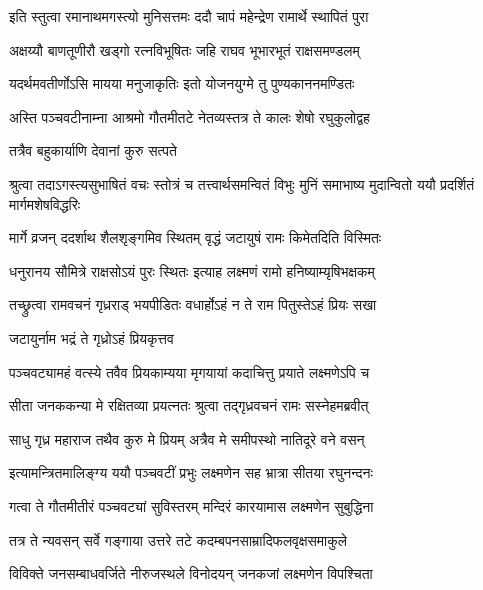 \twolineshloka
{इति स्तुत्वा रमानाथमगस्त्यो मुनिसत्तमः}
{ददौ चापं महेन्द्रेण रामार्थे स्थापितं पुरा} %

\twolineshloka
{अक्षय्यौ बाणतूणीरौ खड्गो रत्नविभूषितः}
{जहि राघव भूभारभूतं राक्षसमण्डलम्} %

\twolineshloka
{यदर्थमवतीर्णोऽसि मायया मनुजाकृतिः}
{इतो योजनयुग्मे तु पुण्यकाननमण्डितः} %

\twolineshloka
{अस्ति पञ्चवटीनाम्ना आश्रमो गौतमीतटे}
{नेतव्यस्तत्र ते कालः शेषो रघुकुलोद्वह} %

\onelineshloka
{तत्रैव बहुकार्याणि देवानां कुरु सत्पते} %


\fourlineindentedshloka
{श्रुत्वा तदाऽगस्त्यसुभाषितं वचः}
{स्तोत्रं च तत्त्वार्थसमन्वितं विभुः}
{मुनिं समाभाष्य मुदान्वितो ययौ}
{प्रदर्शितं मार्गमशेषविद्धरिः} %






\twolineshloka
{मार्गे व्रजन् ददर्शाथ शैलशृङ्गमिव स्थितम्}
{वृद्धं जटायुषं रामः किमेतदिति विस्मितः} %

\twolineshloka
{धनुरानय सौमित्रे राक्षसोऽयं पुरः स्थितः}
{इत्याह लक्ष्मणं रामो हनिष्याम्यृषिभक्षकम्} %

\twolineshloka
{तच्छ्रुत्वा रामवचनं गृध्रराड् भयपीडितः}
{वधार्होऽहं न ते राम पितुस्तेऽहं प्रियः सखा} %

\onelineshloka
{जटायुर्नाम भद्रं ते गृध्रोऽहं प्रियकृत्तव} %


\twolineshloka
{पञ्चवट्यामहं वत्स्ये तवैव प्रियकाम्यया}
{मृगयायां कदाचित्तु प्रयाते लक्ष्मणेऽपि च} %

\twolineshloka
{सीता जनककन्या मे रक्षितव्या प्रयत्नतः}
{श्रुत्वा तद्गृध्रवचनं रामः सस्नेहमब्रवीत्} %

\twolineshloka
{साधु गृध्र महाराज तथैव कुरु मे प्रियम्}
{अत्रैव मे समीपस्थो नातिदूरे वने वसन्} %

\twolineshloka
{इत्यामन्त्रितमालिङ्ग्य ययौ पञ्चवटीं प्रभुः}
{लक्ष्मणेन सह भ्रात्रा सीतया रघुनन्दनः} %

\twolineshloka
{गत्वा ते गौतमीतीरं पञ्चवट्यां सुविस्तरम्}
{मन्दिरं कारयामास लक्ष्मणेन सुबुद्धिना} %

\twolineshloka
{तत्र ते न्यवसन् सर्वे गङ्गाया उत्तरे तटे}
{कदम्बपनसाम्रादिफलवृक्षसमाकुले} %

\twolineshloka
{विविक्ते जनसम्बाधवर्जिते नीरुजस्थले}
{विनोदयन् जनकजां लक्ष्मणेन विपश्चिता} %

